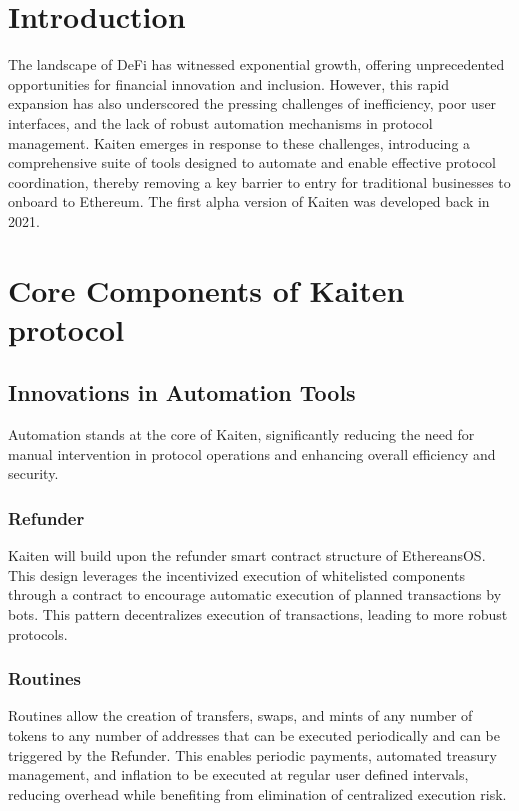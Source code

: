\documentclass[11pt,oneside,a4paper]{article}
\begin{document}
\section{Introduction}
The landscape of DeFi has witnessed exponential growth, offering unprecedented opportunities for financial innovation and inclusion. However, this rapid expansion has also underscored the pressing challenges of inefficiency, poor user interfaces, and the lack of robust automation mechanisms in protocol management. Kaiten emerges in response to these challenges, introducing a comprehensive suite of tools designed to automate and enable effective protocol coordination, thereby removing a key barrier to entry for traditional businesses to onboard to Ethereum. The first alpha version of Kaiten was developed back in 2021.

\section{Core Components of Kaiten protocol}

\subsection{Innovations in Automation Tools}

Automation stands at the core of Kaiten, significantly reducing the need for manual intervention in protocol operations and enhancing overall efficiency and security.

\subsubsection{Refunder}
Kaiten will build upon the refunder smart contract structure of EthereansOS. This design leverages the incentivized execution of whitelisted components through a contract to encourage automatic execution of planned transactions by bots. This pattern decentralizes execution of transactions, leading to more robust protocols.

\subsubsection{Routines}
Routines allow the creation of transfers, swaps, and mints of any number of tokens to any number of addresses that can be executed periodically and can be triggered by the Refunder. This enables periodic payments, automated treasury management, and inflation to be executed at regular user defined intervals, reducing overhead while benefiting from elimination of centralized execution risk.
\end{document}
